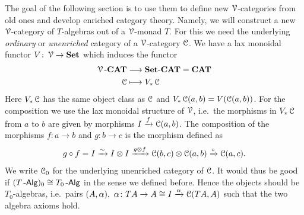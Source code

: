\documentclass[a4paper,11pt,oneside,openany]{scrbook}
\begin{document}
The goal of the following section is to use them to define new $\operatorname{\mathcal{V}}$-categories from old ones and develop enriched category theory. Namely, we will construct a new $\operatorname{\mathcal{V}}$-category of $T$-algebras out of a $\operatorname{\mathcal{V}}$-monad $T$. For this we need the underlying \emph{ordinary} or \emph{unenriched} category of a $\operatorname{\mathcal{V}}$-category $\operatorname{\mathcal{C}}$. We have a lax monoidal functor $V\colon\operatorname{\mathcal{V}}\to{\normalfont\textbf{Set}}$ which induces the functor
\begin{align*}
	\operatorname{\mathcal{V}}\mbox{-}{\normalfont\textbf{CAT}} & \longrightarrow{\normalfont\textbf{Set}}\mbox{-}{\normalfont\textbf{CAT}}={\normalfont\textbf{CAT}} \\
	\operatorname{\mathcal{C}}             & \longmapsto V_*\operatorname{\mathcal{C}}
\end{align*}
Here $V_*\operatorname{\mathcal{C}}$ has the same object class as $\operatorname{\mathcal{C}}$ and $V_*\operatorname{\mathcal{C}}(a,b)=V(\operatorname{\mathcal{C}}(a,b))$. For the composition we use the lax monoidal structure of $\operatorname{\mathcal{V}}$, i.e.\ the morphisms in $V_*\operatorname{\mathcal{C}}$ from $a$ to $b$ are given by morphisms $I\xrightarrow{f}\operatorname{\mathcal{C}}(a,b)$. The composition of the morphisms $f\colon a\to b$ and $g\colon b\to c$ is the morphism defined as
$$g\circ f = I\xrightarrow{\sim} I\otimes I\xrightarrow{g\otimes f}\operatorname{\mathcal{C}}(b,c)\otimes\operatorname{\mathcal{C}}(a,b)\xrightarrow{\circ}\operatorname{\mathcal{C}}(a,c).$$
We write $\operatorname{\mathcal{C}}_0$ for the underlying unenriched category of $\operatorname{\mathcal{C}}$. It would thus be good if $(T\operatorname{-\mathsf{Alg}})_0\cong T_0\operatorname{-\mathsf{Alg}}$ in the sense we defined before. Hence the objects should be $T_0$-algebras, i.e.\ pairs $(A,\alpha), \ \alpha\colon TA\to A\cong I\xrightarrow{\alpha}\operatorname{\mathcal{C}}(TA,A)$ such that the two algebra axioms hold.
\end{document}
